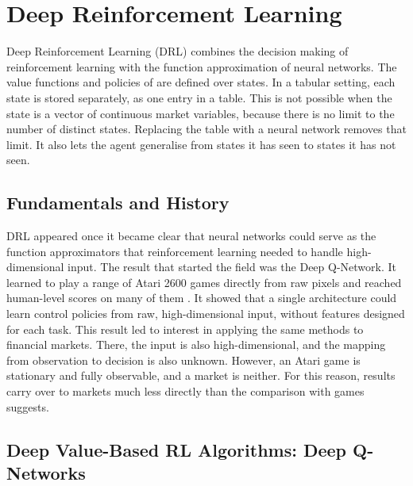 \section{Deep Reinforcement Learning}
\label{Section:DeepReinforcementLearning}

Deep Reinforcement Learning (DRL) combines the decision making of reinforcement learning with the function approximation of neural networks. The value functions and policies of  are defined over states. In a tabular setting, each state is stored separately, as one entry in a table. This is not possible when the state is a vector of continuous market variables, because there is no limit to the number of distinct states. Replacing the table with a neural network removes that limit. It also lets the agent generalise from states it has seen to states it has not seen.

\subsection{Fundamentals and History}

DRL appeared once it became clear that neural networks could serve as the function approximators that reinforcement learning needed to handle high-dimensional input. The result that started the field was the Deep Q-Network. It learned to play a range of Atari 2600 games directly from raw pixels and reached human-level scores on many of them \cite{mnih_playing_2013, mnih_human-level_2015}. It showed that a single architecture could learn control policies from raw, high-dimensional input, without features designed for each task. This result led to interest in applying the same methods to financial markets. There, the input is also high-dimensional, and the mapping from observation to decision is also unknown. However, an Atari game is stationary and fully observable, and a market is neither. For this reason, results carry over to markets much less directly than the comparison with games suggests.

\subsection{Deep Value-Based RL Algorithms: Deep Q-Networks}

